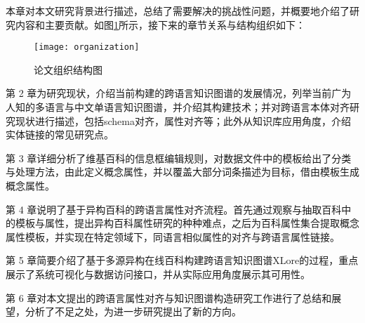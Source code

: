 本章对本文研究背景进行描述，总结了需要解决的挑战性问题，并概要地介绍了研究内容和主要贡献。如图\ref{fig:organization}所示，接下来的章节关系与结构组织如下：

\begin{figure}[ht] %
  \centering
  \texttt{[image: organization]}
  \caption{论文组织结构图}
  \label{fig:organization}
\end{figure}

第 2 章为研究现状，介绍当前构建的跨语言知识图谱的发展情况，列举当前广为人知的多语言与中文单语言知识图谱，并介绍其构建技术；并对跨语言本体对齐研究现状进行描述，包括schema对齐，属性对齐等；此外从知识库应用角度，介绍实体链接的常见研究点。

第 3 章详细分析了维基百科的信息框编辑规则，对数据文件中的模板给出了分类与处理方法，由此定义概念属性，并以覆盖大部分词条描述为目标，借由模板生成概念属性。

第 4 章说明了基于异构百科的跨语言属性对齐流程。首先通过观察与抽取百科中的模板与属性，提出异构百科属性研究的种种难点，之后为百科属性集合提取概念属性模板，并实现在特定领域下，同语言相似属性的对齐与跨语言属性链接。

第 5 章简要介绍了基于多源异构在线百科构建跨语言知识图谱XLore的过程，重点展示了系统可视化与数据访问接口，并从实际应用角度展示其可用性。

第 6 章对本文提出的跨语言属性对齐与知识图谱构造研究工作进行了总结和展望，分析了不足之处，为进一步研究提出了新的方向。


